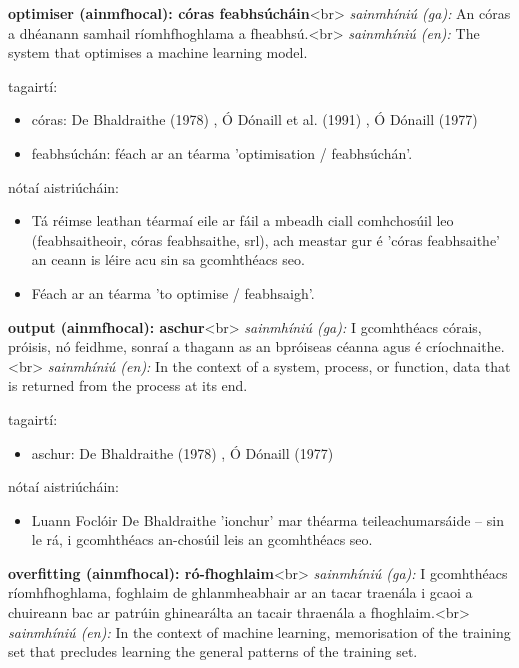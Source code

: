 \documentclass{article}
\begin{document}
\textbf{optimiser (ainmfhocal): córas feabhsúcháin}<br>
\textit{sainmhíniú (ga):} An córas a dhéanann samhail ríomhfhoghlama a fheabhsú.<br>
\textit{sainmhíniú (en):} The system that optimises a machine learning model.

tagairtí:
\begin{itemize}
	\item córas: De Bhaldraithe (1978) \cite{de-bhaldraithe}, Ó Dónaill et al. (1991) \cite{focloir-beag}, Ó Dónaill (1977) \cite{odonaill}
	\item feabhsúchán: féach ar an téarma 'optimisation / feabhsúchán'.
\end{itemize}

nótaí aistriúcháin:
\begin{itemize}
	\item Tá réimse leathan téarmaí eile ar fáil a mbeadh ciall comhchosúil leo (feabhsaitheoir, córas feabhsaithe, srl), ach meastar gur é 'córas feabhsaithe' an ceann is léire acu sin sa gcomhthéacs seo.
	\item Féach ar an téarma 'to optimise / feabhsaigh'.
\end{itemize}


\textbf{output (ainmfhocal): aschur}<br>
\textit{sainmhíniú (ga):} I gcomhthéacs córais, próisis, nó feidhme, sonraí a thagann as an bpróiseas céanna agus é críochnaithe.<br>
\textit{sainmhíniú (en):} In the context of a system, process, or function, data that is returned from the process at its end.

tagairtí:
\begin{itemize}
	\item aschur: De Bhaldraithe (1978) \cite{de-bhaldraithe}, Ó Dónaill (1977) \cite{odonaill}
\end{itemize}

nótaí aistriúcháin:
\begin{itemize}
	\item Luann Foclóir De Bhaldraithe 'ionchur' mar théarma teileachumarsáide -- sin le rá, i gcomhthéacs an-chosúil leis an gcomhthéacs seo.
\end{itemize}


\textbf{overfitting (ainmfhocal): ró-fhoghlaim}<br>
\textit{sainmhíniú (ga):} I gcomhthéacs ríomhfhoghlama, foghlaim de ghlanmheabhair ar an tacar traenála i gcaoi a chuireann bac ar patrúin ghinearálta an tacair thraenála a fhoghlaim.<br>
\textit{sainmhíniú (en):} In the context of machine learning, memorisation of the training set that precludes learning the general patterns of the training set.
\end{document}
